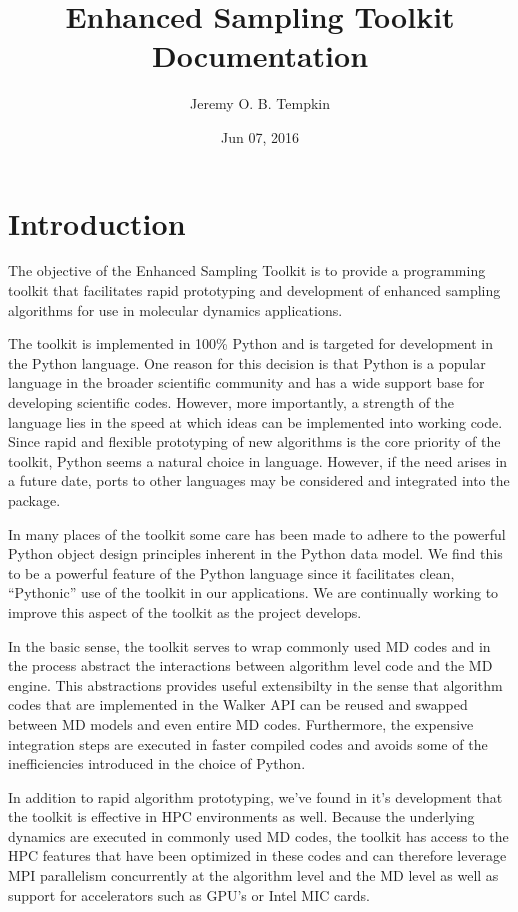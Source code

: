 \documentclass[letterpaper,10pt,english]{sphinxmanual}
\title{Enhanced Sampling Toolkit Documentation}
\date{Jun 07, 2016}
\author{Jeremy O. B. Tempkin}
\begin{document}
\maketitle
\tableofcontents
{}\label{index::doc}



\chapter{Introduction}
\label{intro.doc:introduction}\label{intro.doc:welcome-to-enhanced-sampling-toolkit-s-documentation}\label{intro.doc::doc}
The objective of the Enhanced Sampling Toolkit is to provide a programming toolkit that facilitates rapid prototyping and development of enhanced sampling algorithms for use in molecular dynamics applications.

The toolkit is implemented in 100\% Python and is targeted for development in the Python language. One reason for this decision is that Python is a popular language in the broader scientific community and has a wide support base for developing scientific codes. However, more importantly, a strength of the language lies in the speed at which ideas can be implemented into working code. Since rapid and flexible prototyping of new algorithms is the core priority of the toolkit, Python seems a natural choice in language. However, if the need arises in a future date, ports to other languages may be considered and integrated into the package.

In many places of the toolkit some care has been made to adhere to the powerful Python object design principles inherent in the Python data model. We find this to be a powerful feature of the Python language since it facilitates clean, ``Pythonic'' use of the toolkit in our applications. We are continually working to improve this aspect of the toolkit as the project develops.

In the basic sense, the toolkit serves to wrap commonly used MD codes and in the process abstract the interactions between algorithm level code and the MD engine. This abstractions provides useful extensibilty in the sense that algorithm codes that are implemented in the Walker API can be reused and swapped between MD models and even entire MD codes. Furthermore, the expensive integration steps are executed in faster compiled codes and avoids some of the inefficiencies introduced in the choice of Python.

In addition to rapid algorithm prototyping, we've found in it's development that the toolkit is effective in HPC environments as well. Because the underlying dynamics are executed in commonly used MD codes, the toolkit has access to the HPC features that have been optimized in these codes and can therefore leverage MPI parallelism concurrently at the algorithm level and the MD level as well as support for accelerators such as GPU's or Intel MIC cards.
\end{document}
